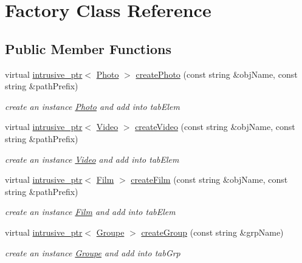 \hypertarget{classFactory}{\section{Factory Class Reference}
\label{classFactory}
}
\subsection*{Public Member Functions}
\begin{DoxyCompactItemize}
\item 
virtual \hyperlink{classintrusive__ptr}{intrusive\-\_\-ptr}$<$ \hyperlink{classPhoto}{Photo} $>$ \hyperlink{classFactory_a45e096d4e252f09009f5535d9fcdc909}{create\-Photo} (const string \&obj\-Name, const string \&path\-Prefix)
\begin{DoxyCompactList}\small\item\em create an instance \hyperlink{classPhoto}{Photo} and add into tab\-Elem \end{DoxyCompactList}\item 
virtual \hyperlink{classintrusive__ptr}{intrusive\-\_\-ptr}$<$ \hyperlink{classVideo}{Video} $>$ \hyperlink{classFactory_a29b1c8f95044fa844dbce01ad9c8cd7d}{create\-Video} (const string \&obj\-Name, const string \&path\-Prefix)
\begin{DoxyCompactList}\small\item\em create an instance \hyperlink{classVideo}{Video} and add into tab\-Elem \end{DoxyCompactList}\item 
virtual \hyperlink{classintrusive__ptr}{intrusive\-\_\-ptr}$<$ \hyperlink{classFilm}{Film} $>$ \hyperlink{classFactory_a5166d846318b026e636280cd222f1b88}{create\-Film} (const string \&obj\-Name, const string \&path\-Prefix)
\begin{DoxyCompactList}\small\item\em create an instance \hyperlink{classFilm}{Film} and add into tab\-Elem \end{DoxyCompactList}\item 
virtual \hyperlink{classintrusive__ptr}{intrusive\-\_\-ptr}$<$ \hyperlink{classGroupe}{Groupe} $>$ \hyperlink{classFactory_aa82dc3b6cb060047cfdf5139fec206ee}{create\-Group} (const string \&grp\-Name)
\begin{DoxyCompactList}\small\item\em create an instance \hyperlink{classGroupe}{Groupe} and add into tab\-Grp \end{DoxyCompactList}\item 

\end{DoxyCompactItemize}
